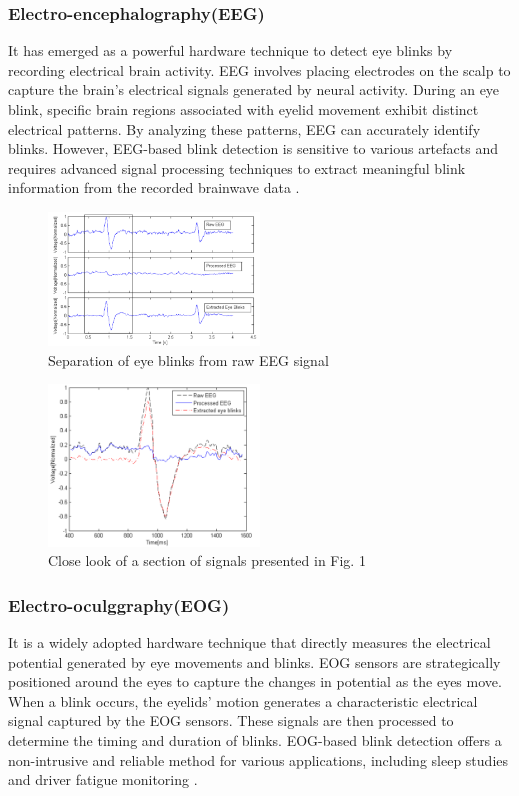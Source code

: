 \documentclass[conference]{IEEEtran}
\begin{document}
\subsubsection{Electro-encephalography(EEG)}
It has emerged as a powerful hardware technique to detect eye blinks by recording electrical brain activity. EEG involves placing electrodes on the scalp to capture the brain's electrical signals generated by neural activity. During an eye blink, specific brain regions associated with eyelid movement exhibit distinct electrical patterns. By analyzing these patterns, EEG can accurately identify blinks. However, EEG-based blink detection is sensitive to various artefacts and requires advanced signal processing techniques to extract meaningful blink information from the recorded brainwave data \cite {EEG2}.
\begin{figure}[htbp]
\centerline{\includegraphics[width=0.5\textwidth]{eeg1.png}}
\caption{  Separation of eye blinks from raw EEG signal \cite {EEG}}
\label{fig2}
\end{figure}
\begin{figure}[htbp]
\centerline{\includegraphics[width=0.5\textwidth]{eeg2.png}}
\caption{ Close look of a section of signals presented in Fig. 1 \cite {EEG}}
\label{fig3}
\end{figure}
\subsubsection{Electro-oculggraphy(EOG)}
It is a widely adopted hardware technique that directly measures the electrical potential generated by eye movements and blinks. EOG sensors are strategically positioned around the eyes to capture the changes in potential as the eyes move. When a blink occurs, the eyelids' motion generates a characteristic electrical signal captured by the EOG sensors. These signals are then processed to determine the timing and duration of blinks. EOG-based blink detection offers a non-intrusive and reliable method for various applications, including sleep studies and driver fatigue monitoring \cite {EOG} \cite{eye blink duration by regression}.
\end{document}
